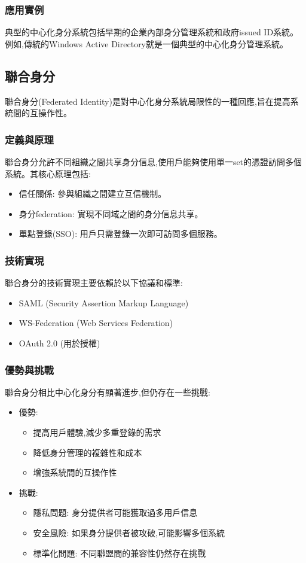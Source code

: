 \subsubsection{應用實例}
典型的中心化身分系統包括早期的企業內部身分管理系統和政府issued ID系統。例如,傳統的Windows Active Directory就是一個典型的中心化身分管理系統。
\subsection{聯合身分}
聯合身分(Federated Identity)是對中心化身分系統局限性的一種回應,旨在提高系統間的互操作性。
\subsubsection{定義與原理}
聯合身分允許不同組織之間共享身分信息,使用戶能夠使用單一set的憑證訪問多個系統。其核心原理包括:
\begin{itemize}
  \item 信任關係: 參與組織之間建立互信機制。
  \item 身分federation: 實現不同域之間的身分信息共享。
  \item 單點登錄(SSO): 用戶只需登錄一次即可訪問多個服務。
\end{itemize}
\subsubsection{技術實現}
聯合身分的技術實現主要依賴於以下協議和標準:
\begin{itemize}
  \item SAML (Security Assertion Markup Language)
  \item WS-Federation (Web Services Federation)
  \item OAuth 2.0 (用於授權)
\end{itemize}
\subsubsection{優勢與挑戰}
聯合身分相比中心化身分有顯著進步,但仍存在一些挑戰:
\begin{itemize}
  \item 優勢:
        \begin{itemize}
          \item 提高用戶體驗,減少多重登錄的需求
          \item 降低身分管理的複雜性和成本
          \item 增強系統間的互操作性
        \end{itemize}
  \item 挑戰:
        \begin{itemize}
          \item 隱私問題: 身分提供者可能獲取過多用戶信息
          \item 安全風險: 如果身分提供者被攻破,可能影響多個系統
          \item 標準化問題: 不同聯盟間的兼容性仍然存在挑戰
        \end{itemize}
\end{itemize}
